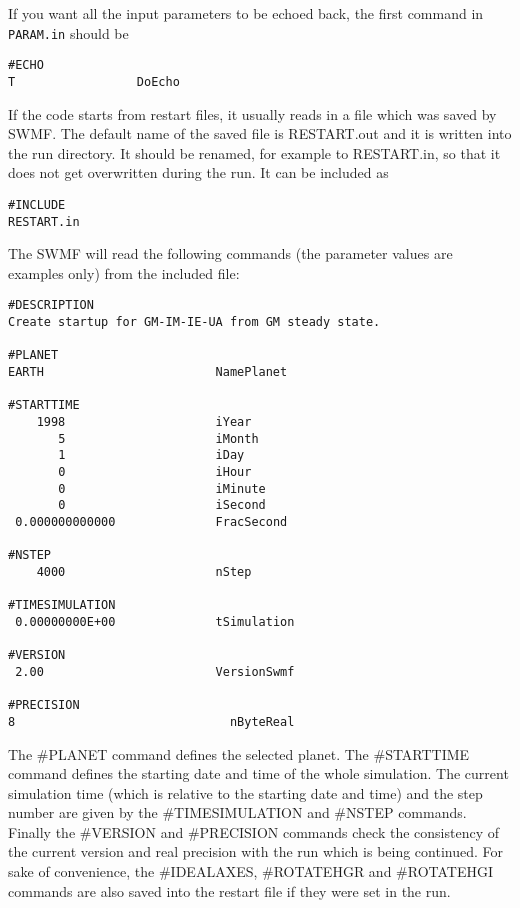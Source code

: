 If you want all the input parameters to be echoed back, the first
command in {\tt PARAM.in} should be
\begin{verbatim}
#ECHO
T                 DoEcho
\end{verbatim}
If the code starts from restart files, it usually reads in a
file which was saved by SWMF. The default name of the saved
file is RESTART.out and it is written into the run directory.
It should be renamed, for example to RESTART.in, so that it
does not get overwritten during the run. It can be included as
\begin{verbatim}
#INCLUDE
RESTART.in
\end{verbatim}
The SWMF will read the following commands (the parameter values are
examples only) from the included file:
\begin{verbatim}
#DESCRIPTION
Create startup for GM-IM-IE-UA from GM steady state.

#PLANET
EARTH                        NamePlanet

#STARTTIME
    1998                     iYear
       5                     iMonth
       1                     iDay
       0                     iHour
       0                     iMinute
       0                     iSecond
 0.000000000000              FracSecond
 
#NSTEP
    4000                     nStep
 
#TIMESIMULATION
 0.00000000E+00              tSimulation
 
#VERSION
 2.00                        VersionSwmf
 
#PRECISION
8                              nByteReal
\end{verbatim}
The \#PLANET command defines the selected planet.
The \#STARTTIME command defines the starting date and time of the whole
simulation. The current simulation time (which is relative to
the starting date and time) and the step number are
given by the \#TIMESIMULATION and \#NSTEP commands. Finally
the \#VERSION and \#PRECISION commands check the consistency
of the current version and real precision with the run which
is being continued. For sake of convenience, the \#IDEALAXES,
\#ROTATEHGR and \#ROTATEHGI commands are also saved 
into the restart file if they were set in the run.


